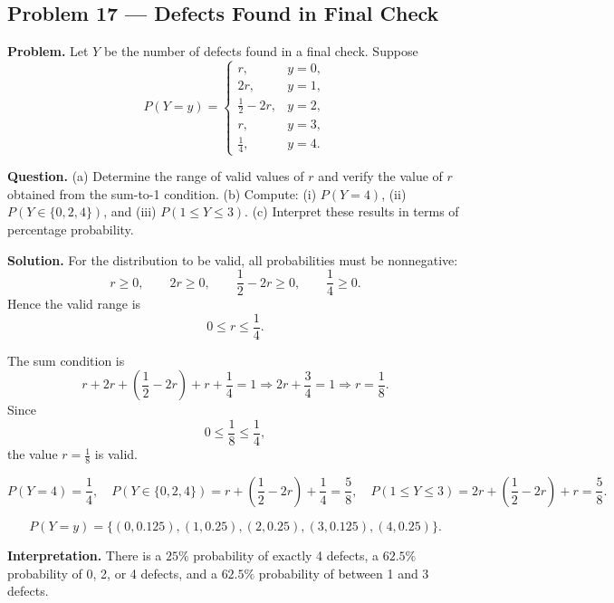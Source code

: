 \begin{ExamProblems}
		
		
		
		\item
		\subsection*{Problem 17 — Defects Found in Final Check}
		
			\textbf{Problem.}
		Let $Y$ be the number of defects found in a final check. Suppose
		\[
		P(Y=y)=\begin{cases}
			r, & y=0,\\
			2r, & y=1,\\
			\frac{1}{2}-2r, & y=2,\\
			r, & y=3,\\
			\frac{1}{4}, & y=4.
		\end{cases}
		\]
		
		\textbf{Question.}
		(a) Determine the range of valid values of $r$ and verify the value of $r$ obtained from the sum-to-1 condition.
		(b) Compute: (i) $P(Y=4)$, (ii) $P(Y\in\{0,2,4\})$, and (iii) $P(1\le Y\le 3)$.
		(c) Interpret these results in terms of percentage probability.
		
		\textbf{Solution.}
		For the distribution to be valid, all probabilities must be nonnegative:
		\[
		r\ge 0,\qquad 2r\ge 0,\qquad \frac{1}{2}-2r\ge 0,\qquad \frac{1}{4}\ge 0.
		\]
		Hence the valid range is
		\[
		0\le r\le \frac{1}{4}.
		\]
		
		The sum condition is
		\[
		r+2r+\left(\frac{1}{2}-2r\right)+r+\frac{1}{4}=1
		\Rightarrow 2r+\frac{3}{4}=1
		\Rightarrow r=\frac{1}{8}.
		\]
		Since
		\[
		0\le \frac{1}{8}\le \frac{1}{4},
		\]
		the value $r=\frac{1}{8}$ is valid.
		
		\[
		P(Y=4)=\frac{1}{4},\quad
		P(Y\in\{0,2,4\})=r+\left(\frac{1}{2}-2r\right)+\frac{1}{4}=\frac{5}{8},\quad
		P(1\le Y\le 3)=2r+\left(\frac{1}{2}-2r\right)+r=\frac{5}{8}.
		\]
		
\[
		P(Y=y)=\{(0,0.125),(1,0.25),(2,0.25),(3,0.125),(4,0.25)\}.
		\]
\begin{center}
		\end{center}
\textbf{Interpretation.} There is a $25\%$ probability of exactly 4 defects, a $62.5\%$ probability of 0, 2, or 4 defects, and a $62.5\%$ probability of between 1 and 3 defects.
		

\end{ExamProblems}

